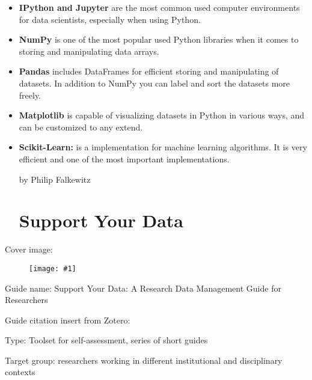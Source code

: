 \documentclass{article}
\newlength{\imgwidth}
\newcommand\scaledgraphics[2]{%
                
\settowidth{\imgwidth}{\texttt{[image: \#1]}}%
                
\setlength{\imgwidth}{\minof{\imgwidth}{#2\textwidth}}%
                
\texttt{[image: \#1]}%
                
}
\begin{document}
\begin{itemize}
\item \textbf{IPython and Jupyter} are the most common used computer environments for data scientists, especially when using Python.


\item \textbf{NumPy }is one of the most popular used Python libraries when it comes to storing and manipulating data arrays.


\item \textbf{Pandas }includes DataFrames for efficient storing and manipulating of datasets. In addition to NumPy you can label and sort the datasets more freely.


\item \textbf{Matplotlib }is capable of visualizing datasets in Python in various ways, and can be customized to any extend.


\item \textbf{Scikit-Learn: }is a implementation for machine learning algorithms. It is very efficient and one of the most important implementations.





by Philip Falkewitz





\section{Support Your Data}\label{H2541051}



\end{itemize}

Cover image: 


\begin{center}
\begin{figure}
\scaledgraphics{45bdf5de-7e5b-448d-820a-d3b3288a4dbe.png}{0.5}
\label{F88206441}
\end{figure}


\end{center}


Guide name: Support Your Data: A Research Data Management Guide for Researchers


Guide citation insert from Zotero: \autocite{borghi_support_2018}


Type: Toolset for self-assessment, series of short guides


Target group: researchers working in different institutional and disciplinary contexts
\end{document}
